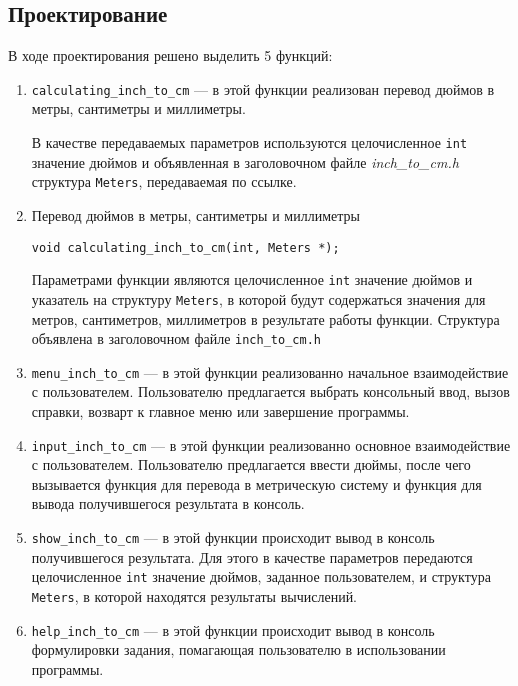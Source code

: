 \documentclass[12pt,a4paper]{report}
\begin{document}
\subsection{Проектирование}
\hspace{\parindent}В ходе проектирования решено выделить 5 функций:
\begin{enumerate}
	\item \texttt{calculating\_inch\_to\_cm} ---
	в этой функции реализован перевод дюймов в метры, сантиметры и миллиметры.
	
	В качестве передаваемых параметров используются целочисленное \texttt{int} значение дюймов и объявленная в заголовочном файле \textit{inch\_to\_cm.h} структура \texttt{Meters}, передаваемая по ссылке.
	
 	\item Перевод дюймов в метры, сантиметры и миллиметры
 	
 	\verb+void calculating_inch_to_cm(int, Meters *);+
 
 		Параметрами функции являются целочисленное \verb+int+ значение дюймов и указатель на структуру \verb+Meters+, в которой будут содержаться значения для метров, сантиметров, миллиметров в результате работы функции.
 		Структура объявлена в заголовочном файле \verb+inch_to_cm.h+
		
		 
		 
		 
	\item \texttt{menu\_inch\_to\_cm} ---
	в этой функции реализованно начальное взаимодействие с пользователем. Пользователю предлагается выбрать консольный ввод, вызов справки, возварт к главное меню или завершение программы.	
		 
	\item \texttt{input\_inch\_to\_cm} ---
	в этой функции реализованно основное взаимодействие с пользователем. Пользователю предлагается ввести дюймы, после чего вызывается функция для перевода в метрическую систему и функция для вывода получившегося результата в консоль.
	
	\item \texttt{show\_inch\_to\_cm} ---
	в этой функции происходит вывод в консоль получившегося результата. Для этого в качестве параметров передаются целочисленное \texttt{int} значение дюймов, заданное пользователем, и структура \texttt{Meters}, в которой находятся результаты вычислений.
	
	\item \texttt{help\_inch\_to\_cm} ---
	в этой функции происходит вывод в консоль формулировки задания, помагающая пользователю в использовании программы.
\end{enumerate}
\end{document}
